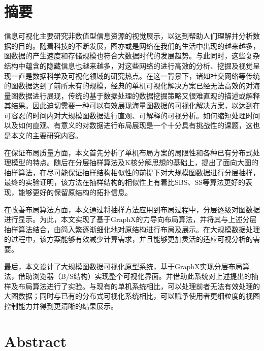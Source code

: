 \chapter{摘\quad 要}%
\linespread{1.5}

信息可视化主要研究非数值型信息资源的视觉展示，以达到帮助人们理解并分析数据的目的。随着科技的不断发展，图亦或是网络在我们的生活中出现的越来越多，图数据的产生速度和存储规模也符合大数据时代的发展趋势。与此同时，这些复杂结构中蕴含的隐藏信息也越来越多，对这些网络的进行高效的分析、挖掘及视觉呈现一直是数据科学及可视化领域的研究热点。在这一背景下，诸如社交网络等传统的图数据达到了前所未有的规模，经典的单机可视化解决方案已经无法高效的对海量图数据进行展现，传统的基于数据处理的数据挖掘策略又很难直观的描述或解释其结果。因此迫切需要一种可以有效展现海量图数据的可视化解决方案，以达到在可容忍的时间内对大规模图数据进行直观、可解释的可视分析。如何缩短处理时间以及如何直观、有意义的对数据进行布局展现是一个十分具有挑战性的课题，这也是本文的主要研究内容。

在保证布局质量方面，本文首先分析了单机布局方案的局限性和各种已有分布式处理模型的特点。随后在分层抽样算法及K核分解思想的基础上，提出了面向大图的抽样算法，在尽可能保证抽样结构相似性的前提下对大规模图数据进行分层抽样，最终的实验证明，该方法在抽样结构的相似性上有着比SBS、SS等算法更好的表现，能够更好的保留原结构的拓扑信息。

在改善布局算法方面，本文通过将抽样方法应用到布局过程中，分层逐级对图数据进行显示。为此，本文实现了基于GraphX的力导向布局算法，并将其与上述分层抽样算法结合，由简入繁逐渐细化地对原结构进行布局及展示。在大规模数据处理的过程中，该方案能够有效减少计算需求，并且能够更加灵活的适应可视分析的需要。

最后，本文设计了大规模图数据可视化原型系统，基于GraphX实现分层布局算法，借助浏览器（B/S结构）实现整个可视化界面。并借助此系统对上述提出的抽样及布局算法进行了实验。与现有的单机系统相比，可以处理前者无法有效处理的大图数据；同时与已有的分布式可视化系统相比，可以赋予使用者更细粒度的视图控制能力并得到更清晰的结果展示。


\chapter{Abstract}%

